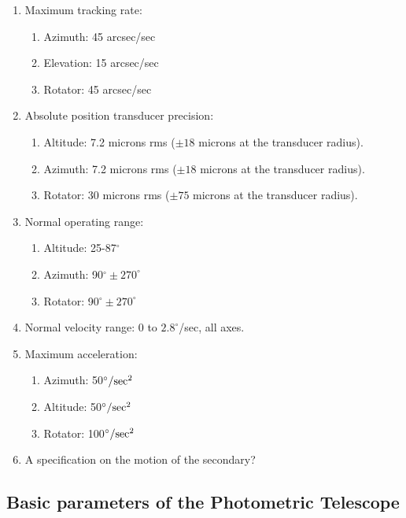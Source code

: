 \begin{enumerate}
\begin{enumerate}
\item Maximum tracking rate:
\begin{enumerate}
\item Azimuth: 45 arcsec/sec
\item Elevation: 15 arcsec/sec
\item Rotator: 45 arcsec/sec
\end{enumerate}

\item Absolute position transducer precision:
\begin{enumerate}
\item Altitude: 7.2 microns rms ($\pm 18$ microns at the transducer radius). 
\item Azimuth: 7.2 microns rms ($\pm 18$ microns at the transducer radius). 
\item Rotator: 30 microns rms  ($\pm 75$ microns at the transducer radius). 
\end{enumerate}

\item Normal operating range:
\begin{enumerate}
\item Altitude: 25-87$^\circ$
\item Azimuth: 90$^\circ\pm 270^\circ$
\item Rotator: 90$^\circ\pm 270^\circ$
\end{enumerate}

\item Normal velocity range: 0 to $2.8^\circ$/sec, all axes.

\item Maximum acceleration:
\begin{enumerate}
\item Azimuth: 50$^\circ/\rm sec^2$
\item Altitude: 50$^\circ/\rm sec^2$ 
\item Rotator: 100$^\circ/\rm sec^2$ 
\end{enumerate}

\item A specification on the motion of the secondary? 

\end{enumerate}
\end{enumerate}

\subsection{Basic parameters of the Photometric Telescope}

